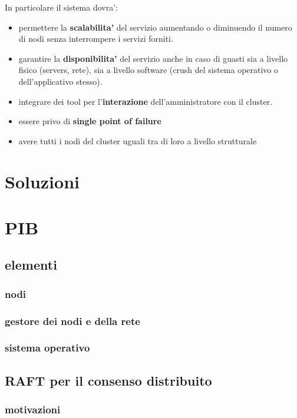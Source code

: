 \documentclass[a4paper]{article}
\begin{document}
\begin{flushleft}
In particolare il sistema dovra':
\end{flushleft}

\begin{itemize}
    \item{permettere la \textbf{scalabilita'} del servizio aumentando o diminuendo il numero di nodi
        senza interrompere i servizi forniti.}
    \item{garantire la \textbf{disponibilita'} del servizio anche in caso di guasti sia a livello fisico 
        (servers, rete), sia a livello software 
        (crush del sistema operativo o dell'applicativo stesso).}
    \item{integrare dei tool per l'\textbf{interazione} dell'amministratore con il cluster.}
    \item{essere privo di \textbf{single point of failure}}
    \item{avere tutti i nodi del cluster uguali tra di loro a livello strutturale}
\end{itemize}

\section{Soluzioni}

\section{PIB}
\subsection{elementi}
\subsubsection{nodi}
\subsubsection{gestore dei nodi e della rete}
\subsubsection{sistema operativo}
\subsection{RAFT per il consenso distribuito}
\subsubsection{motivazioni}
\end{document}
